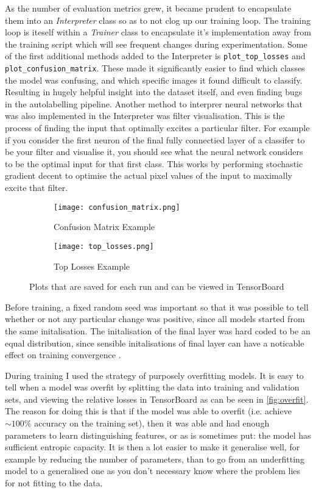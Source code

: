 As the number of evaluation metrics grew, it became prudent to encapsulate them into an \textit{Interpreter} class so as to not clog up our 
training loop.  The training loop is iteself within a \textit{Trainer} class to encapsulate it's implementation away from the training script which will 
see frequent changes during experimentation.  Some of the first additional methods added to the Interpreter is \verb|plot_top_losses| and
\verb|plot_confusion_matrix|.  These made it significantly easier to find which classes the model was confusing, and which specific images it 
found difficult to classify.  Resulting in hugely helpful insight into the dataset itself, and even finding bugs in the autolabelling pipeline.
Another method to interprer neural networks that was also implemented in the Interpreter was filter visualisation.  This is the process 
of finding the input that optimally excites a particular filter.  For example if you consider the first neuron of the final fully connectied 
layer of a classifer to be your filter and visualise it, you should see what the neural network considers to be the optimal input for that 
first class.  This works by performing stochastic gradient decent to optimise the actual pixel values of the input to maximally excite that filter.

\begin{figure}[h]
    \centering
    \begin{subfigure}[b]{0.49\textwidth}
        \centering
        \texttt{[image: confusion\_matrix.png]}
        \caption{Confusion Matrix Example}
    \end{subfigure}
    \hfill
    \begin{subfigure}[b]{0.49\textwidth}
        \centering
        \texttt{[image: top\_losses.png]}
        \caption{Top Losses Example}
    \end{subfigure}
\caption{Plots that are saved for each run and can be viewed in TensorBoard}
\label{fig:plots}
\end{figure}

Before training, a fixed random seed was important so that it was possible to tell whether or not any particular change was positive, since all models started
from the same initalisation.  The initalisation of the final layer was hard coded to be an equal distribution, since sensible initalisations of final layer can have 
a noticable effect on training convergence \cite{kumar2017weight}.

During training I used the strategy of purposely overfitting models.  It is easy to tell when a model was overfit by splitting the data into
training and validation sets, and viewing the relative losses in TensorBoard as can be seen in \autoref{fig:overfit}.  The reason for doing this
is that if the model was able to overfit (i.e. achieve $\sim100\%$ accuracy on the training set), then it was able and had enough parameters to learn distinguishing features, or
as is sometimes put: the model has sufficient entropic capacity.  It is then a lot easier to make it generalise well, for example by reducing the number of parameters, 
than to go from an underfitting model to a generalised one as you don't necessary know where the problem lies for not fitting to the data.

